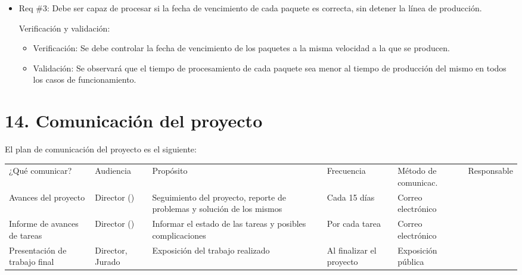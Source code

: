 \documentclass[11pt]{charter}
\begin{document}
\begin{itemize} 
\item Req \#3: Debe ser capaz de procesar si la fecha de vencimiento de cada paquete es correcta, sin detener la línea de producción.

Verificación y validación:

\begin{itemize}
\item Verificación: Se debe controlar la fecha de vencimiento de los paquetes a la misma velocidad a la que se producen.
\item Validación: Se observará que el tiempo de procesamiento de cada paquete sea menor al tiempo de producción del mismo en todos los casos de funcionamiento.

\end{itemize}

\end{itemize}



\newpage
\section{14. Comunicación del proyecto}
\label{sec:comunicaciones}

El plan de comunicación del proyecto es el siguiente:

\begin{table}[htpb]
\centering
\begin{tabularx}{\linewidth}{@{}|X|C{2.4cm}|C{3cm}|C{1.8cm}|C{2cm}|C{2.1cm}|@{}}
\hline
{} 
           \\ \hline
{} 
¿Qué comunicar? & Audiencia & Propósito & Frecuencia & Método de comunicac. & Responsable \\ \hline
Avances del proyecto			&Director (\supname	)	&Seguimiento del proyecto, reporte de problemas y solución de los mismos           &Cada 15 días            &Correo electrónico                       &\authorname            \\ \hline
Informe de avances de tareas	&Director (\supname	)	&Informar el estado de las tareas y posibles complicaciones           &Por cada tarea                                 &Correo electrónico  &\authorname     \\ \hline
Presentación de trabajo final	&Director, Jurado				&Exposición del trabajo realizado           &Al finalizar el proyecto &Exposición pública                      &\authorname         \\ \hline

\end{tabularx}
\end{table}
\end{document}
